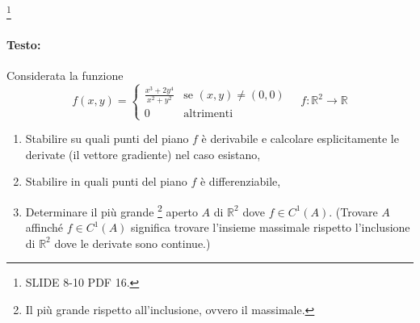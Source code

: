\begin{example}
	\footnote{SLIDE 8-10 PDF 16.}
	\paragraph{Testo:}
	Considerata la funzione
	\begin{equation*}
		f(x,y) =
		\begin{cases}
			\frac{x^3 + 2y^4}{x^2+y^2} & \text{se } (x,y)\neq(0,0)\\
			0 & \text{altrimenti}
		\end{cases}
		\quad f\colon\mathbb{R}^2 \rightarrow \mathbb{R}
	\end{equation*}
	\begin{enumerate}
		\item Stabilire su quali punti del piano $f$ è derivabile e calcolare esplicitamente le derivate (il vettore gradiente) nel caso esistano,
		\item Stabilire in quali punti del piano $f$ è differenziabile,
		\item Determinare il più grande \footnote{Il più grande rispetto all'inclusione, ovvero il massimale.} aperto $A$ di $\mathbb{R}^2$ dove $f\in C^1(A)$. (Trovare $A$ affinché $f\in C^1(A)$ significa trovare l'insieme massimale rispetto l'inclusione di $\mathbb{R}^2$ dove le derivate sono continue.)
	\end{enumerate}

\end{example}
